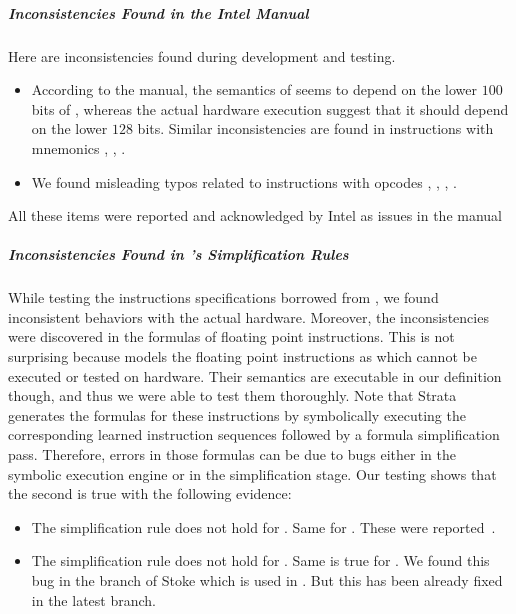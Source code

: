 \subparagraph{Inconsistencies Found in the Intel Manual} Here are inconsistencies found during development and testing.  
\begin{itemize}
    \item According to the manual, the semantics of   seems to depend on the lower $100$ bits of , whereas the actual hardware execution suggest that it should depend on the lower $128$ bits. Similar inconsistencies are found in instructions with mnemonics , , .
    
    \item We found misleading typos related to instructions with opcodes , , , .    
\end{itemize}
All these items were reported and acknowledged by Intel as issues in the manual~\cite{Suppl}
 
\subparagraph{Inconsistencies Found in \Strata's Simplification Rules}
While testing the instructions specifications borrowed from \Strata, we found inconsistent behaviors with the actual hardware. Moreover, the inconsistencies were discovered in the formulas of floating point instructions. This is not surprising because \Strata models the floating point instructions as \uif{} which cannot be executed or tested on hardware. Their semantics are executable in our definition though, and thus we were able to test them thoroughly. Note that Strata generates the formulas for these instructions by symbolically  executing  the corresponding learned  instruction sequences followed by a formula simplification pass. Therefore, errors in those formulas can be due to bugs either in the symbolic execution engine or in the simplification stage. Our testing shows that the second is true with the following evidence:
  \begin{itemize}
      \item The simplification rule  does not hold for . Same for . These were reported~\cite{PC1}.
       
      \item The simplification rule  does not hold for .  Same is true for . We found this bug in the  branch of Stoke which is used in \Strata. But this has been already fixed in the latest \Stoke branch.
  \end{itemize}

